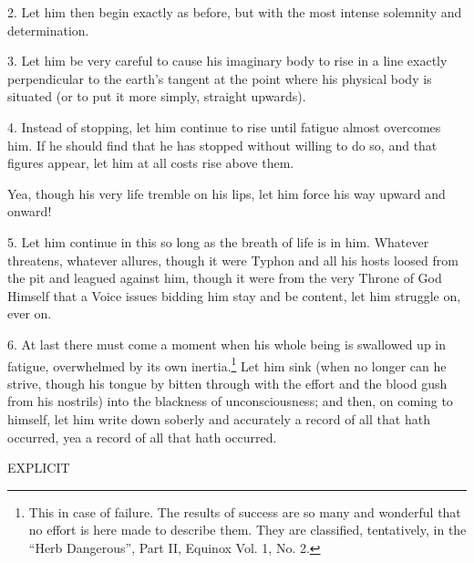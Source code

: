 2. Let him then begin exactly as before, but with the most intense solemnity and determination.

3. Let him be very careful to cause his imaginary body to rise in a line exactly perpendicular to the earth's tangent at the point where his physical body is situated (or to put it more simply, straight upwards).

4. Instead of stopping, let him continue to rise until fatigue almost overcomes him. If he should find that he has stopped without willing to do so, and that figures appear, let him at all costs rise above them.

Yea, though his very life tremble on his lips, let him force his way upward and onward!

5. Let him continue in this so long as the breath of life is in him. Whatever threatens, whatever allures, though it were Typhon and all his hosts loosed from the pit and leagued against him, though it were from the very Throne of God Himself that a Voice issues bidding him stay and be content, let him struggle on, ever on.

6. At last there must come a moment when his whole being is swallowed up in fatigue, overwhelmed by its own inertia.\footnote{This in case of failure. The results of success are so many and wonderful that no effort is here made to describe them. They are classified, tentatively, in the \enquote{Herb Dangerous}, Part II, Equinox Vol. 1, No. 2.} Let him sink (when no longer can he strive, though his tongue by bitten through with the effort and the blood gush from his nostrils) into the blackness of unconsciousness; and then, on coming to himself, let him write down soberly and accurately a record of all that hath occurred, yea a record of all that hath occurred.

{
\centering

\textsc{EXPLICIT}
\par
}
